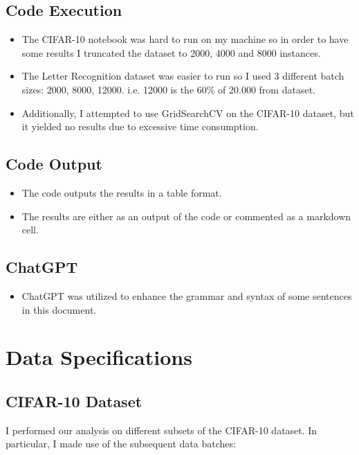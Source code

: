 \documentclass[conference]{IEEEtran}
\begin{document}
\subsection{Code Execution}

\begin{itemize}
\item The CIFAR-10 notebook was hard to run on my machine so in order to have some results I truncated the dataset to 2000, 4000 and 8000 instances.
\item The Letter Recognition dataset was easier to run so I used 3 different batch sizes: 2000, 8000, 12000.
i.e. 12000 is the 60\% of 20.000 from dataset.
\item Additionally, I attempted to use GridSearchCV on the CIFAR-10 dataset, but it yielded no results due to excessive time consumption.
\end{itemize}

\subsection{Code Output}

\begin{itemize}
\item The code outputs the results in a table format.
\item The results are either as an output of the code or commented as a markdown cell. 
\end{itemize}

\subsection{ChatGPT}

\begin{itemize}
\item ChatGPT was utilized to enhance the grammar and syntax of some sentences in this document.
\end{itemize}

\section{Data Specifications}

\subsection{CIFAR-10 Dataset}

I performed our analysis on different subsets of the CIFAR-10 dataset. In particular, I made use of the subsequent data batches:
\end{document}

